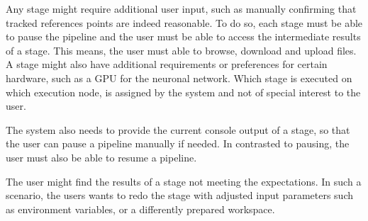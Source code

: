 Any stage might require additional user input, such as manually confirming that tracked references points are indeed reasonable.
To do so, each stage must be able to pause the pipeline and the user must be able to access the intermediate results of a stage.
This means, the user must able to browse, download and upload files.
A stage might also have additional requirements or preferences for certain hardware, such as a GPU for the neuronal network.
Which stage is executed on which execution node, is assigned by the system and not of special interest to the user. 

The system also needs to provide the current console output of a stage, so that the user can pause a pipeline manually if needed.
In contrasted to pausing, the user must also be able to resume a pipeline.

The user might find the results of a stage not meeting the expectations.
In such a scenario, the users wants to redo the stage with adjusted input parameters such as environment variables, or a differently prepared workspace.

